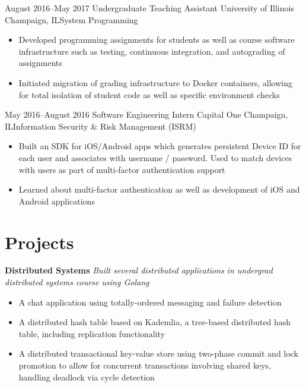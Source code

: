 \documentclass[10pt,a4paper,sans]{moderncv}        %
\begin{document}
\cventry
{August 2016--May 2017}
{\vspace{1pt}Undergraduate Teaching Assistant}
{University of Illinois}
{Champaign, IL}{System Programming}
{
\begin{itemize}
  \item Developed programming assignments for students as well as course software
        infrastructure such as testing, continuous integration, and autograding of
        assignments
  \item Initiated migration of grading infrastructure to Docker containers,
        allowing for total isolation of student code as well as specific environment checks
\end{itemize}}

\vspace{3pt}

\cventry
{May 2016--August 2016}
{\vspace{1pt}Software Engineering Intern}
{Capital One}
{Champaign, IL}{Information Security \& Risk Management (ISRM)}
{\vspace{1pt}
\begin{itemize}
  \item Built an SDK for iOS/Android apps which generates persistent
        Device ID for each user and associates with username / password.
        Used to match devices with users as part of multi-factor authentication support
  \item Learned about multi-factor authentication as well as development of iOS and Android
        applications
\end{itemize}}


\section{Projects}

\vspace{2pt}
\textbf{Distributed Systems}\newline
\textit{Built several distributed applications in undergrad distributed systems course using Golang}
\begin{itemize}
\item A chat application using totally-ordered messaging and failure detection
\item A distributed hash table based on Kademlia, a tree-based distributed hash table, including replication functionality
\item A distributed transactional key-value store using two-phase commit and lock promotion to allow for concurrent transactions involving shared keys, handling deadlock via cycle detection
\end{itemize}
\end{document}
